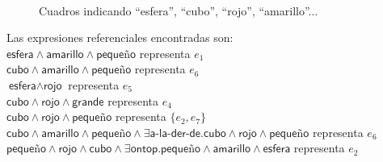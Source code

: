 \begin{figure}[ht]
\begin{center}
\\[0pt]
\caption{Cuadros indicando ``esfera'', ``cubo'', ``rojo'', ``amarillo''...}
\label{fig-modelo17}
\end{center}
\end{figure}

Las expresiones referenciales encontradas son:\\

$\textsf{esfera} \wedge \textsf{amarillo} \wedge \textsf{peque\~no}$ representa $e_1$ \\
$\textsf{cubo} \wedge \textsf{amarillo} \wedge \textsf{peque\~no}$ representa $e_6$ \\
$\textsf{esfera} \wedge \textsf{rojo}$ representa $e_5$ \\
$\textsf{cubo} \wedge \textsf{rojo} \wedge \textsf{grande}$ representa $e_4$ \\
$\textsf{cubo} \wedge \textsf{rojo} \wedge \textsf{peque\~no}$ representa $\{e_2,e_7\}$  \\
$\textsf{cubo} \wedge \textsf{amarillo} \wedge \textsf{peque\~no} \wedge \exists \textsf{a-la-der-de}. \textsf{cubo} \wedge \textsf{rojo} \wedge \textsf{peque\~no}$ representa $e_6$ \\
$\textsf{peque\~no} \wedge \textsf{rojo} \wedge \textsf{cubo} \wedge \exists \textsf{ontop}. \textsf{peque\~no} \wedge \textsf{amarillo} \wedge \textsf{esfera}$ representa $e_2$ \\

